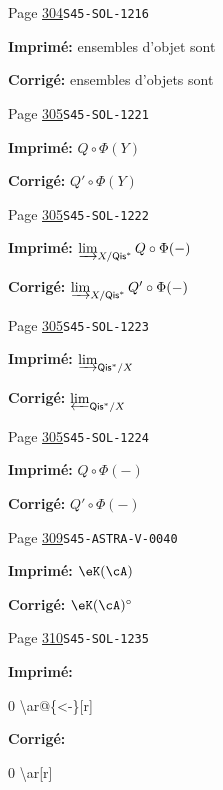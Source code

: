 \documentclass[oneside]{book}
\theoremstyle{sga-source}
\theoremstyle{sga-source-dash}
\theoremstyle{sga-source-dotdash}
\theoremstyle{sga-source-number-note-dash}
\theoremstyle{sga-source-note-number-dotdash}
\theoremstyle{sga-source-example-dotdash}
\theoremstyle{sga-source-inline-number}
\theoremstyle{sga-source-bare-number}
\theoremstyle{sga-source}
\begin{document}
\begin{description}
\smallskip
\item[\hypertarget{apparatus:FR-0304}{304}] Page \hyperlink{printpage:fr:304}{304}\quad\texttt{S45-SOL-1216}
\par\noindent\textbf{Imprimé:} ensembles d'objet sont
\par\noindent\textbf{Corrigé:} ensembles d'objets sont
\smallskip
\item[\hypertarget{apparatus:FR-0305}{305}] Page \hyperlink{printpage:fr:305}{305}\quad\texttt{S45-SOL-1221}
\par\noindent\textbf{Imprimé:} $Q\circ \Phi(Y)$
\par\noindent\textbf{Corrigé:} $Q'\circ \Phi(Y)$
\smallskip
\item[\hypertarget{apparatus:FR-0306}{306}] Page \hyperlink{printpage:fr:305}{305}\quad\texttt{S45-SOL-1222}
\par\noindent\textbf{Imprimé:} \(\varinjlim_{X/\mathsf{Qis}^\ast} Q\circ\Phi(-)\)
\par\noindent\textbf{Corrigé:} \(\varinjlim_{X/\mathsf{Qis}^\ast} Q'\circ\Phi(-)\)
\smallskip
\item[\hypertarget{apparatus:FR-0307}{307}] Page \hyperlink{printpage:fr:305}{305}\quad\texttt{S45-SOL-1223}
\par\noindent\textbf{Imprimé:} \(\varinjlim_{\mathsf{Qis}^\ast/X}\)
\par\noindent\textbf{Corrigé:} \(\varprojlim_{\mathsf{Qis}^\ast/X}\)
\smallskip
\item[\hypertarget{apparatus:FR-0308}{308}] Page \hyperlink{printpage:fr:305}{305}\quad\texttt{S45-SOL-1224}
\par\noindent\textbf{Imprimé:} \(Q\circ \Phi(-)\)
\par\noindent\textbf{Corrigé:} \(Q'\circ \Phi(-)\)
\smallskip
\item[\hypertarget{apparatus:FR-0309}{309}] Page \hyperlink{printpage:fr:309}{309}\quad\texttt{S45-ASTRA-V-0040}
\par\noindent\textbf{Imprimé:} \(\eK(\cA)\)
\par\noindent\textbf{Corrigé:} \(\eK(\cA)^\circ\)
\smallskip
\item[\hypertarget{apparatus:FR-0310}{310}] Page \hyperlink{printpage:fr:310}{310}\quad\texttt{S45-SOL-1235}
\par\noindent\textbf{Imprimé:} {\footnotesize\ttfamily\raggedright 0 \textbackslash{}\allowbreak{}ar@\{\allowbreak{}<-\allowbreak{}\}\allowbreak{}[\allowbreak{}r]\allowbreak{}\par}
\par\noindent\textbf{Corrigé:} {\footnotesize\ttfamily\raggedright 0 \textbackslash{}\allowbreak{}ar[\allowbreak{}r]\allowbreak{}\par}

\end{description}
\end{document}
